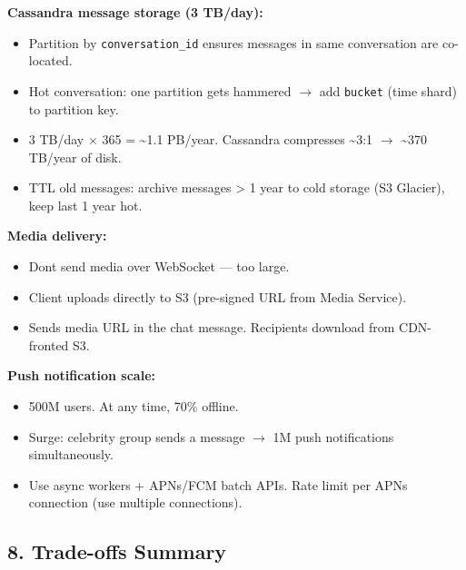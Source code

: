 \documentclass[11pt]{article}
\providecommand{\tightlist}{\setlength{\itemsep}{1pt}\setlength{\parskip}{0pt}}
\begin{document}
\textbf{Cassandra message storage (3 TB/day):}

\begin{itemize}
\tightlist
\item
  Partition by \texttt{conversation\_id} ensures messages in same conversation are co-located.
\item
  Hot conversation: one partition gets hammered \(\rightarrow\) add \texttt{bucket} (time shard) to partition key.
\item
  3 TB/day \(\times\) 365 = \textasciitilde1.1 PB/year. Cassandra compresses \textasciitilde3:1 \(\rightarrow\) \textasciitilde370 TB/year of disk.
\item
  TTL old messages: archive messages \textgreater{} 1 year to cold storage (S3 Glacier), keep last 1 year hot.
\end{itemize}

\textbf{Media delivery:}

\begin{itemize}
\tightlist
\item
  Don\textquotesingle t send media over WebSocket --- too large.
\item
  Client uploads directly to S3 (pre-signed URL from Media Service).
\item
  Sends media URL in the chat message. Recipients download from CDN-fronted S3.
\end{itemize}

\textbf{Push notification scale:}

\begin{itemize}
\tightlist
\item
  500M users. At any time, 70\% offline.
\item
  Surge: celebrity group sends a message \(\rightarrow\) 1M push notifications simultaneously.
\item
  Use async workers + APNs/FCM batch APIs. Rate limit per APNs connection (use multiple connections).
\end{itemize}

\subsection{8. Trade-offs Summary}\label{8-trade-offs-summary-3}
\end{document}
